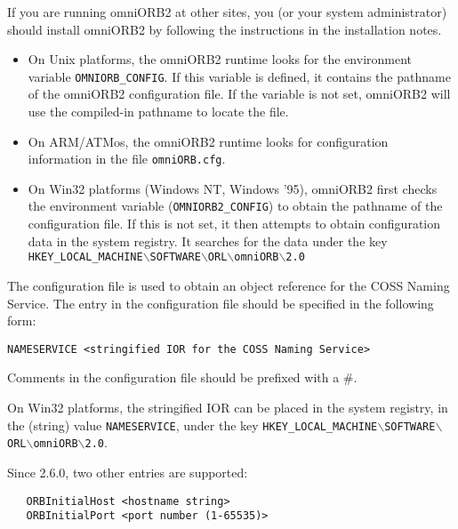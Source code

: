 \documentclass[11pt,twoside,onecolumn]{book}
\begin{document}

If you are running omniORB2 at other sites, you (or your system
administrator) should install omniORB2 by following the instructions in the
installation notes. 

\begin{itemize}

\item On Unix platforms, the omniORB2 runtime looks for the environment
variable {\tt OMNIORB\_CONFIG}. If this variable is defined, it contains
the pathname of the omniORB2 configuration file. If the variable is not
set, omniORB2 will use the compiled-in pathname to locate the file.

\item On ARM/ATMos, the omniORB2 runtime looks for configuration
information in the file {\tt omniORB.cfg}.

\item On Win32 platforms (Windows NT, Windows '95), omniORB2 first checks the 
environment variable ({\tt OMNIORB2\_CONFIG}) to obtain the pathname of the 
configuration file. If this is not set, it then attempts to obtain 
configuration data in the system registry. It searches for the data under 
the key {\tt HKEY\_LOCAL\_MACHINE$\backslash$SOFTWARE$\backslash$ORL$\backslash$omniORB$\backslash$2.0}

\end{itemize}

The configuration file is used to obtain an object reference for the
COSS Naming Service. The entry in the configuration file should be specified
in the following form:

{\tt NAMESERVICE <stringified IOR for the COSS Naming Service>}

Comments in the configuration file should be prefixed with a \#.

On Win32 platforms, the stringified IOR can be placed in the system registry, 
in the (string) value {\tt NAMESERVICE}, under the key 
{\tt HKEY\_LOCAL\_MACHINE$\backslash$SOFTWARE$\backslash$ORL$\backslash$omniORB$\backslash$2.0}.

Since 2.6.0, two other entries are supported:

\begin{verbatim}
   ORBInitialHost <hostname string>
   ORBInitialPort <port number (1-65535)>
\end{verbatim}
\end{document}
